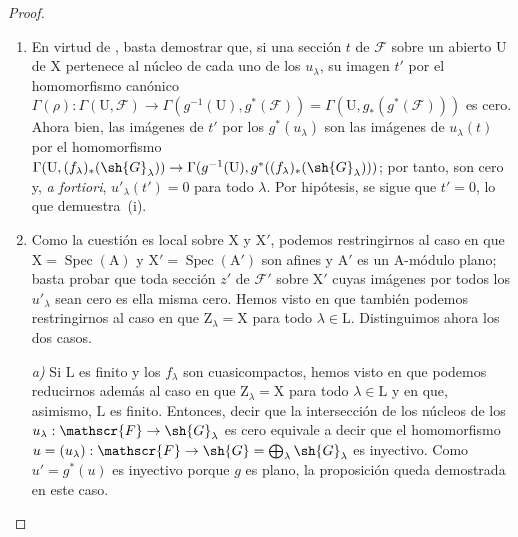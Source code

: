 \begin{proof}
\begin{enumerate}[label=(\roman*)]
  \item En virtud de , basta demostrar que, si una sección $t$ de $\mathscr{F}$ sobre un abierto $\mathrm{U}$ de $\mathrm{X}$ pertenece al núcleo de cada uno de los $u_\lambda$, su imagen $t'$ por el homomorfismo canónico $\Gamma(\rho):\Gamma(\mathrm{U},\mathscr{F})\to\Gamma(g^{-1}(\mathrm{U}),g^*(\mathscr{F}))=\Gamma(\mathrm{U},g_*(g^*(\mathscr{F})))$ es cero.
  Ahora bien, las imágenes de $t'$ por los $g^*(u_\lambda)$ son las imágenes de $u_\lambda(t)$ por el homomorfismo $\Gamma(\mathrm{U},(f_\lambda)_*(\sh{G}_\lambda))\to\Gamma(g^{-1}(\mathrm{U}),g^*((f_\lambda)_*(\sh{G}_\lambda)))$; por tanto, son cero y, \emph{a fortiori}, $u'_\lambda(t')=0$ para todo $\lambda$. Por hipótesis, se sigue que $t'=0$, lo que demuestra~(i).

  \item Como la cuestión es local sobre $\mathrm{X}$ y $\mathrm{X}'$, podemos restringirnos al caso en que $\mathrm{X}=\operatorname{Spec}(\mathrm{A})$ y $\mathrm{X}'=\operatorname{Spec}(\mathrm{A}')$ son afines y $\mathrm{A}'$ es un $\mathrm{A}$-módulo plano; basta probar que toda sección $z'$ de $\mathscr{F}'$ sobre $\mathrm{X}'$ cuyas imágenes por todos los $u'_\lambda$ sean cero es ella misma cero.
  Hemos visto en  que también podemos restringirnos al caso en que $\mathrm{Z}_\lambda=\mathrm{X}$ para todo $\lambda\in\mathrm{L}$.
  Distinguimos ahora los dos casos.
  \medskip

  \emph{a)} Si $\mathrm{L}$ es finito y los $f_\lambda$ son cuasicompactos, hemos visto en  que podemos reducirnos además al caso en que $\mathrm{Z}_\lambda=\mathrm{X}$ para todo $\lambda\in\mathrm{L}$ y en que, asimismo, $\mathrm{L}$ es finito.
  Entonces, decir que la intersección de los núcleos de los $u_\lambda:\mathscr{F}\to\sh{G}_\lambda$ es cero equivale a decir que el homomorfismo $u=(u_\lambda):\mathscr{F}\to\sh{G}=\bigoplus_\lambda\sh{G}_\lambda$ es inyectivo.
  Como $u'=g^*(u)$ es inyectivo porque $g$ es plano, la proposición queda demostrada en este caso.


\end{enumerate}
\end{proof}
